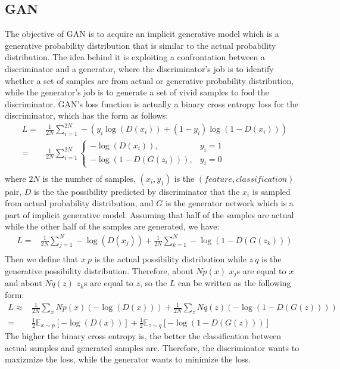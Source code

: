 \documentclass[UTF8, a4paper, 11pt]{article}
\begin{document}
\subsection{GAN}
The objective of GAN is to acquire an implicit generative model which is a generative probability distribution that is similar to the actual probability distribution.
The idea behind it is exploiting a confrontation between a discriminator and a generator, where the discriminator's job is to identify whether a set of samples are
from actual or generative probability distribution, while the generator's job is to generate a set of vivid samples to fool the discriminator. GAN's loss function is
actually a binary cross entropy loss for the discriminator, which has the form as follows:
$$\begin{aligned}
    L=&\frac1{2N}\sum_{i=1}^{2N}-(y_i\log(D(x_i))+(1-y_i)\log(1-D(x_i)))\\
    =&\frac1{2N}\sum_{i=1}^{2N}
    \begin{cases}
        -\log(D(x_i)),&y_i=1\\
        -\log(1-D(G(z_i))),&y_i=0
    \end{cases}\\
\end{aligned}$$
where $2N$ is the number of samples, $(x_i,y_1)$ is the $(feature, classification)$ pair, $D$ is the the possibility predicted by discriminator that the $x_i$ is
sampled from actual probability distribution, and $G$ is the generator network which is a part of implicit generative model. Assuming that half of the samples are
actual while the other half of the samples are generated, we have:
$$\begin{aligned}
    L=&\frac1{2N}\sum_{j=1}^{N}-\log(D(x_j))+\frac1{2N}\sum_{k=1}^{N}-\log(1-D(G(z_k)))\\
\end{aligned}$$
Then we define that $x~p$ is the actual possibility distribution while $z~q$ is the generative possibility distribution. Therefore, about $Np(x)$ $x_j$s are equal to
$x$ and about $Nq(z)$ $z_k$s are equal to $z$, so the $L$ can be written as the following form:
$$\begin{aligned}
    L\approx&\frac1{2N}\sum_x Np(x)(-\log(D(x)))+\frac1{2N}\sum_z Nq(z)(-\log(1-D(G(z))))\\
    =&\frac1 2\mathbb{E}_{x\sim p}[-\log(D(x))]+\frac1 2\mathbb{E}_{z\sim q}[-\log(1-D(G(z)))]
\end{aligned}$$
The higher the binary cross entropy is, the better the classification between actual samples and generated samples are. Therefore, the discriminator wants to
maxizmize the loss, while the generator wants to minimize the loss.
\end{document}

